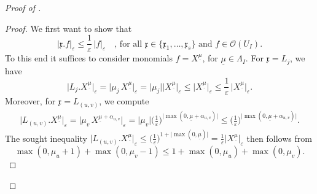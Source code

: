 \documentclass[a4paper, reqno, 10pt]{amsart}
\theoremstyle{definition}
\numberwithin{equation}{section}
\newcommand{\abs}[1]{{\lvert{#1}\rvert}}
\newcommand{\ul}[1]{{\underline{#1}}}
\newcommand{\CO}{{\mathcal {O}}}
\newcommand{\Fx}{{\mathfrak {x}}}
\begin{document}
\begin{proof}[{Proof of }]
\begin{proof}
	
	We first want to show that
	\begin{equation}\label{Eq 3 - Norm estimate for Lie algebra basis element}
		\lvert \Fx . f \rvert_\varepsilon \leq \frac{1}{\varepsilon} \, \lvert f \rvert_\varepsilon \quad \text{, for all $\Fx\in \{\Fx_1,\ldots,\Fx_s\}$ and $f \in \CO(U_I)$.}
	\end{equation}
	To this end it suffices to consider monomials $f = X^\ul{\mu}$, for $\ul{\mu} \in \Lambda_I$.
	For $\Fx = L_j$, we have
	\begin{equation*}
		\lvert L_j . X^\ul{\mu} \rvert_\varepsilon = \lvert \mu_j \, X^\ul{\mu} \rvert_\varepsilon = \abs{\mu_j} \lvert X^\ul{\mu} \rvert_\varepsilon \leq \lvert X^\ul{\mu} \rvert_\varepsilon \leq  \frac{1}{\varepsilon}\, \lvert X^\ul{\mu} \rvert_\varepsilon .
	\end{equation*}
	Moreover, for $\Fx = L_{(u,v)}$, we compute
	\begin{align*}
		\lvert L_{(u,v)} . X^\ul{\mu} \rvert_\varepsilon
		= \lvert \mu_v \, X^{\ul{\mu} + \alpha_{u,v}} \rvert_\varepsilon
		= \abs{\mu_v} \bigg( \frac{1}{\varepsilon} \bigg)^{\abs{\max(0,\ul{\mu}+\alpha_{u,v})}}
		\leq \bigg( \frac{1}{\varepsilon} \bigg)^{\abs{\max(0,\ul{\mu}+\alpha_{u,v})}}.
	\end{align*}
	The sought inequality $\lvert L_{(u,v)} . X^\ul{\mu} \rvert_\varepsilon \leq  \big( \frac{1}{\varepsilon} \big)^{1+ \abs{\max(0,\ul{\mu})}} = \frac{1}{\varepsilon} \lvert X^\ul{\mu} \rvert_\varepsilon $ then follows from
	\begin{equation*}
		\max(0,\mu_u+1) + \max(0,\mu_v-1) \leq 1 + \max(0,\mu_u) + \max(0,\mu_v) .
	\end{equation*}
	
	
	

\end{proof}
\end{proof}
\end{document}

